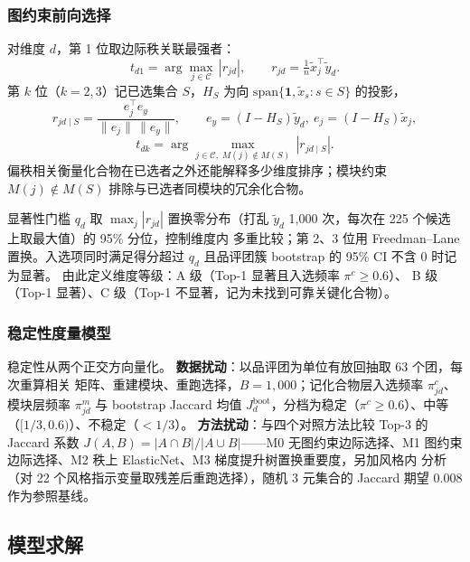 \documentclass[12pt,a4paper]{article}
\begin{document}
\subsubsection{图约束前向选择}

对维度 $d$，第 1 位取边际秩关联最强者：
\begin{equation}
  t_{d1}=\arg\max_{j\in\mathcal C}\,|r_{jd}|,\qquad
  r_{jd}=\tfrac1n\tilde x_j^\top\tilde y_d .
\end{equation}
第 $k$ 位（$k=2,3$）记已选集合 $S$，$H_S$ 为向
$\mathrm{span}\{\mathbf 1,\tilde x_s:s\in S\}$ 的投影，
\begin{equation}
  r_{jd\mid S}=\frac{e_j^\top e_y}{\|e_j\|\,\|e_y\|},\qquad
  e_y=(I-H_S)\tilde y_d,\ e_j=(I-H_S)\tilde x_j,
\end{equation}
\begin{equation}
  t_{dk}=\arg\max_{j\in\mathcal C,\;M(j)\notin M(S)}\,|r_{jd\mid S}| .
\end{equation}
偏秩相关衡量化合物在已选者之外还能解释多少维度排序；模块约束
$M(j)\notin M(S)$ 排除与已选者同模块的冗余化合物。

显著性门槛 $q_d$ 取 $\max_j|r_{jd}|$ 置换零分布（打乱 $\tilde y_d$
1{,}000 次，每次在 225 个候选上取最大值）的 95\% 分位，控制维度内
多重比较；第 2、3 位用 Freedman--Lane 置换。入选项同时满足得分超过
$q_d$ 且品评团簇 bootstrap 的 95\% CI 不含 0 时记为显著。
由此定义维度等级：A 级（Top-1 显著且入选频率 $\pi^c\ge0.6$）、
B 级（Top-1 显著）、C 级（Top-1 不显著，记为未找到可靠关键化合物）。

\subsubsection{稳定性度量模型}

稳定性从两个正交方向量化。
\textbf{数据扰动}：以品评团为单位有放回抽取 63 个团，每次重算相关
矩阵、重建模块、重跑选择，$B=1{,}000$；记化合物层入选频率
$\pi^c_{jd}$、模块层频率 $\pi^m_{jd}$ 与 bootstrap Jaccard 均值
$J^{\mathrm{boot}}_d$，分档为稳定（$\pi^c\ge0.6$）、中等
（$[1/3,0.6)$）、不稳定（$<1/3$）。
\textbf{方法扰动}：与四个对照方法比较 Top-3 的 Jaccard 系数
$J(A,B)=|A\cap B|/|A\cup B|$——M0 无图约束边际选择、M1 图约束
边际选择、M2 秩上 ElasticNet、M3 梯度提升树置换重要度，另加风格内
分析（对 22 个风格指示变量取残差后重跑选择），随机 3 元集合的
Jaccard 期望 0.008 作为参照基线。

\subsection{模型求解}
\end{document}
